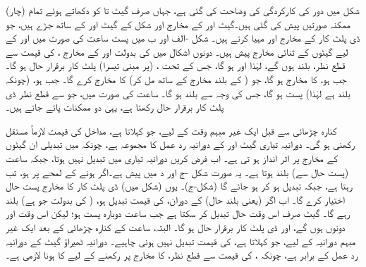 شکل  میں دور کی کارکردگی کی وضاحت کی گئی ہے، جہاں صرف گیٹ  تا  کو دکھاتے ہوئے تمام (چار) ممکنہ صورتیں پیش کی گئی ہیں۔گیٹ  اور  کے مخارج  اور  شکل  کے گیٹ  اور  کے ساتھ جڑے ہیں، جو ڈی پلٹ کار کے مخارج  اور  مہیا کرتے ہیں۔ شکل  -الف اور ب میں پست ساعت  کی صورت میں  اور  کے لیے گیٹوں کے ثنائی مخارج پیش ہیں۔ دونوں اشکال میں  کی بدولت  اور  کے مخارج ،  کی قیمت سے قطع نظر، بلند ہوں گے، لہٰذا  اور  ہو گا، جس کے تحت ، (پر مبنی تیسرا) پلٹ کار برقرار حال ہو گا۔ جب  ہو،  کا مخارج  ہو گا، جو ( کے بلند مخارج کے ساتھ مل کر)  کا مخارج  کرے گا۔ جب  ہو، (چونکہ  بلند ہے لہٰذا) پست  ہو گا، جس کی وجہ سے  بلند  ہو گا۔ ساعت  کی صورت میں، جو  سے قطع نظر ڈی پلٹ کار برقرار حال رکھتا ہے، یہی دو ممکنات پائے جاتے ہیں۔


کنارہ چڑھائی سے قبل ایک غیر مبہم وقت کے لیے، جو  کہلاتا ہے، مداخل  کی قیمت لازماً مستقل رکھنی ہو گی۔ دورانیہ تیاری گیٹ  اور  کے دورانیہ رد عمل کا مجموعہ ہے، چونکہ  میں تبدیلی ان گیٹوں کے مخارج پر اثر انداز ہو تی ہے۔ اب فرض کریں دورانیہ تیاری میں  تبدیل نہیں ہوتا، جبکہ ساعت (پست حال سے) بلند  ہوتا ہے۔ یہ صورت شکل -ج اور د میں پیش ہے۔اگر  ہونے کے لمحے پر  ہو، تب  رہتا ہے، جبکہ  تبدیل ہو کر  ہو جائے گا (شکل-ج)۔ یوں (شکل  میں) ڈی پلٹ کار کا مخارج  پست  حال اختیار کرے گا۔ اب اگر  (یعنی بلند حال) کے دوران،  کی قیمت تبدیل ہو، ( کی بدولت جو  ہے)  بلند  رہے گا۔ گیٹ  صرف اس وقت حال تبدیل کر سکتا ہے جب ساعت دوبارہ پست  ہو؛ لیکن اس وقت  اور  دونوں  ہوں گے، اور ڈی پلٹ کار برقرار حال ہو گا۔ البتہ، ساعت کے کنارہ چڑھائی کے بعد ایک غیر مبہم دورانیہ کے لیے، جو  کہلاتا ہے،  کی قیمت تبدیل نہیں ہونی چاہیے۔ دورانیہ ٹھیراؤ گیٹ  کے دورانیہ رد عمل کے برابر ہے، چونکہ ،  کی قیمت سے قطع نظر،  کا مخارج  پر رکھنے کے لیے  کا  ہونا لازمی ہے۔
 
